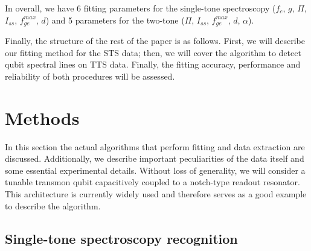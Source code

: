 \documentclass[%
 aip,
 amsmath,amssymb,
 reprint,%
]{revtex4-1}
\begin{document}
In overall, we have 6 fitting parameters for the single-tone spectroscopy ($f_c$, $g$, $\Pi$, $I_{ss}$, $f_{ge}^{max}$, $d$) and  5 parameters for the two-tone ($\Pi$, $I_{ss}$, $f_{ge}^{max}$, $d$, $\alpha$).

Finally, the structure of the rest of the paper is as follows. First, we will describe our fitting method for the STS data; then, we will cover the algorithm to detect qubit spectral lines on TTS data. Finally, the fitting accuracy, performance and reliability of both procedures will be assessed.



\section{Methods}

In this section the actual algorithms that perform fitting and data extraction are discussed. Additionally, we describe important peculiarities of the data itself and some essential experimental details. Without loss of generality, we will consider a tunable transmon\cite{koch2007} qubit capacitively coupled to a notch-type readout resonator. This architecture is currently widely used\cite{barends2013} and therefore serves as a good example to describe the algorithm.


\subsection{Single-tone spectroscopy recognition}
\end{document}
